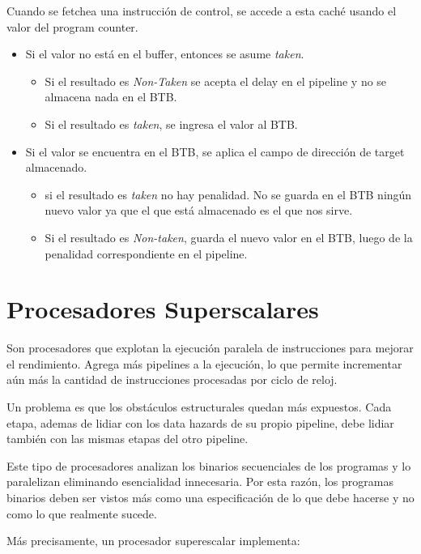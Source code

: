 \begin{itemize}
	Cuando se fetchea una instrucción de control, se accede a esta caché usando el valor del program counter.
	\begin{itemize}
		\item Si el valor no está en el buffer, entonces se asume \textit{taken}.
		\begin{itemize}
			\item Si el resultado es \textit{Non-Taken} se acepta el delay en el pipeline y no se almacena nada en el BTB.
			\item Si el resultado es \textit{taken}, se ingresa el valor al BTB.
		\end{itemize}
		\item Si el valor se encuentra en el BTB, se aplica el campo de dirección de target almacenado.
		\begin{itemize}
			\item si el resultado es \textit{taken} no hay penalidad. No se guarda en el BTB ningún nuevo valor ya que el que está almacenado es el que nos sirve.
			\item Si el resultado es \textit{Non-taken}, guarda el nuevo valor en el BTB, luego de la penalidad correspondiente en el pipeline. 
		\end{itemize}
	\end{itemize}
\end{itemize}

\newpage
\section{Procesadores Superscalares}
Son procesadores que explotan la ejecución paralela de instrucciones para mejorar el rendimiento. Agrega más pipelines a la ejecución, lo que permite incrementar aún más la cantidad de instrucciones procesadas por ciclo de reloj.

Un problema es que los obstáculos estructurales quedan más expuestos. Cada etapa, ademas de lidiar con los data hazards de su propio pipeline, debe lidiar también con las mismas etapas del otro pipeline. 

Este tipo de procesadores analizan los binarios secuenciales de los programas y lo paralelizan eliminando esencialidad innecesaria. Por esta razón, los programas binarios deben ser vistos más como una especificación de lo que debe hacerse y no como lo que realmente sucede.

Más precisamente, un procesador superescalar implementa:

